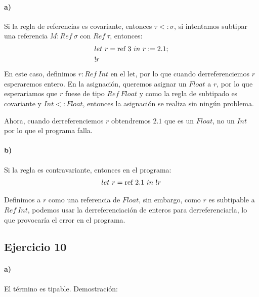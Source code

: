 \documentclass[10pt,a4paper, landscape]{article}
\begin{document}
\begin{multicols}{2}
		\paragraph{a)} Si la regla de referencias es covariante, entonces $\tau <: \sigma$, si intentamos subtipar una referencia $M:Ref~\sigma$ con $Ref~\tau$, entonces:
		\begin{align*}
		&let~r = \text{ref}~3~in~r := 2.1; \\
		&!r
		\end{align*}
		En este caso, definimos $r : Ref~Int$ en el let, por lo que cuando derreferenciemos $r$ esperaremos entero. En la asignación, queremos asignar un $Float$ a $r$, por lo que esperariamos que $r$ fuese de tipo $Ref~Float$ y como la regla de subtipado es covariante y $Int <: Float$, entonces la asignación se realiza sin ningún problema.
		
		Ahora, cuando derreferenciemos $r$ obtendremos $2.1$ que es un $Float$, no un $Int$ por lo que el programa falla.
		
		\paragraph{b)} Si la regla es contravariante, entonces en el programa:
		\begin{align*}
		let~r = \text{ref}~2.1~in~!r
		\end{align*}
		
		Definimos a $r$ como una referencia de $Float$, sin embargo, como $r$ es subtipable a $Ref~Int$, podemos usar la derreferenciación de enteros para derreferenciarla, lo que provocaría el error en el programa.
		
	\end{multicols}

	\newpage
	\subsection{Ejercicio 10}
	\paragraph{a)} El término es tipable. Demostración:
	
\end{document}
